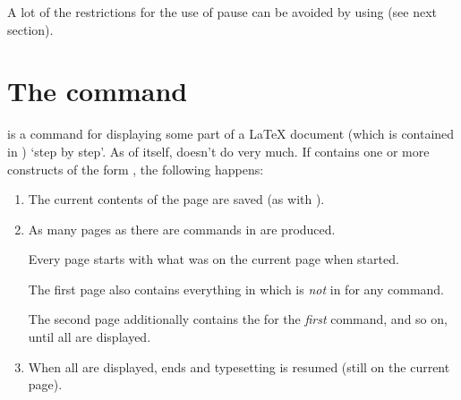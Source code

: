   A lot of the restrictions for the use of pause can be avoided by using  (see next section).
  
  \newslide

  \section{The  command}
   is a command for displaying some part of a \LaTeX{} document (which
  is contained in ) `step by step'. As of itself,  doesn't do very much. If
   contains one or more constructs of the form , the
  following happens:
  \begin{enumerate}
  \item The current contents of the page are saved (as with ).

  \item As many pages as there are  commands in  are produced.

    Every page starts with what was on the current page when  started.

    \newslide
    
    The first page also contains everything in  which is \emph{not} in  for any
     command.

    The second page additionally contains the  for the \emph{first}  command, and so
    on, until all  are displayed.

  \item When all  are displayed,  ends and typesetting is resumed (still on the
    current page).
  \end{enumerate}
  

  \newslide

